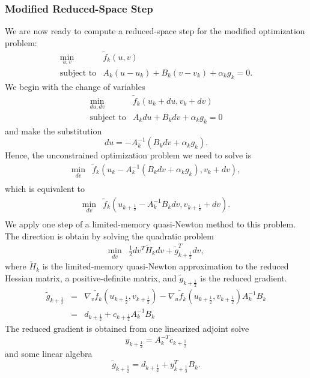 \subsubsection{Modified Reduced-Space Step}
We are now ready to compute a reduced-space step for the modified
optimization problem:
\[
\begin{array}{ll}
\displaystyle \min_{u,v} & \tilde{f}_k(u, v) \\
\mbox{subject to} & A_k (u-u_k) + B_k (v-v_k) + \alpha_k g_k = 0.
\end{array}
\]
We begin with the change of variables
\[
\begin{array}{ll}
\displaystyle \min_{du,dv} & \tilde{f}_k(u_k+du, v_k+dv) \\
\mbox{subject to} & A_k du + B_k dv + \alpha_k g_k = 0
\end{array}
\]
and make the substitution
\[
  du = -A_k^{-1}(B_k dv + \alpha_k g_k).
\]
Hence, the unconstrained optimization problem we need to solve is
\[
\begin{array}{ll}
\displaystyle \min_{dv} & \tilde{f}_k(u_k-A_k^{-1}(B_k dv + \alpha_k g_k), v_k+dv), \\
\end{array}
\]
which is equivalent to
\[
\begin{array}{ll}
\displaystyle \min_{dv} & \tilde{f}_k(u_{k+\frac{1}{2}} - A_k^{-1} B_k dv, v_{k+\frac{1}{2}}+dv). \\
\end{array}
\]
We apply one step of a limited-memory quasi-Newton method to this
problem.  The direction is obtain by solving the quadratic problem
\[
\begin{array}{ll}
\displaystyle \min_{dv} & \frac{1}{2} dv^T \tilde{H}_k dv + \tilde{g}_{k+\frac{1}{2}}^T dv,
\end{array}
\]
where $\tilde{H}_k$ is the limited-memory quasi-Newton approximation
to the reduced Hessian matrix, a positive-definite matrix, and 
$\tilde{g}_{k+\frac{1}{2}}$ is the reduced gradient.
\[
\begin{array}{lcl}
\tilde{g}_{k+\frac{1}{2}} & = & \nabla_v \tilde{f}_k(u_{k+\frac{1}{2}}, v_{k+\frac{1}{2}}) -
	      \nabla_u \tilde{f}_k(u_{k+\frac{1}{2}}, v_{k+\frac{1}{2}}) A_k^{-1} B_k \\
	   & = & d_{k+\frac{1}{2}} + c_{k+\frac{1}{2}} A_k^{-1} B_k
\end{array}
\]
The reduced gradient is obtained from one linearized adjoint solve
\[
y_{k+\frac{1}{2}} = A_k^{-T}c_{k+\frac{1}{2}}
\]
and some linear algebra
\[
\tilde{g}_{k+\frac{1}{2}} = d_{k+\frac{1}{2}} + y_{k+\frac{1}{2}}^T B_k.
\]
